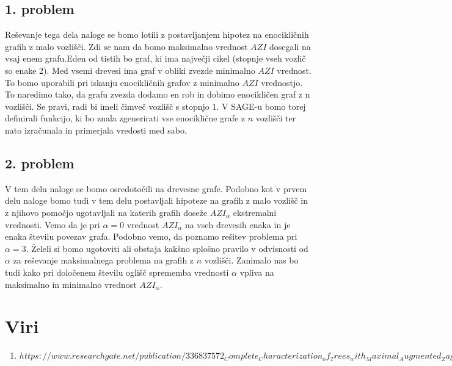 \documentclass[12pt,a4paper]{amsart}
\begin{document}
\begin{flushleft}
\subsection{1. problem}
Reševanje tega dela naloge se bomo lotili z postavljanjem hipotez na enocikličnih grafih z malo vozlišči. Zdi se nam da bomo maksimalno vrednost $AZI$ dosegali na vsaj enem grafu.Eden od tistih bo graf, ki ima največji cikel (stopnje vseh vozlič so enake 2). Med vsemi drevesi ima graf v obliki zvezde minimalno $AZI$ vrednost. To bomo uporabili pri iskanju enocikličnih grafov z minimalno $AZI$ vrednostjo. To naredimo tako, da grafu zvezda dodamo en rob in dobimo enocikličen graf z n vozlišči. Se pravi, radi bi imeli čimveč vozlišč s stopnjo 1.
 V SAGE-u bomo torej definirali funkcijo, ki bo znala zgenerirati vse enociklične grafe z $n$ vozlišči ter nato izračunala in primerjala vredosti med sabo.  

\subsection{2. problem}
V tem delu naloge se bomo osredotočili na drevesne grafe. Podobno kot v prvem delu naloge bomo tudi v tem delu postavljali hipoteze na grafih z malo vozlišč in z njihovo pomočjo ugotavljali na katerih grafih doseže $AZI_{\alpha}$ ekstremalni vrednosti. Vemo da je pri $\alpha = 0$ vrednost $AZI_{\alpha}$ na vseh drevesih enaka in je enaka  številu povezav grafa. Podobno vemo, da poznamo rešitev problema pri $\alpha =3$. Želeli si bomo ugotoviti ali obstaja kakšno splošno pravilo v odvisnosti od $\alpha$ za reševanje maksimalnega problema na grafih z $n$ vozlišči. Zanimalo nas bo tudi kako pri določenem številu oglišč sprememba vrednosti $\alpha$ vpliva na maksimalno in minimalno vrednost $AZI_{\alpha}$.

\section{\textbf{Viri}}

\begin{enumerate}

\item{$https://www.researchgate.net/publication/336837572_Complete_Characterization_of_Trees_with_Maximal_Augmented_Zagreb_Index$}

\end{enumerate}

\end{flushleft}
\end{document}
